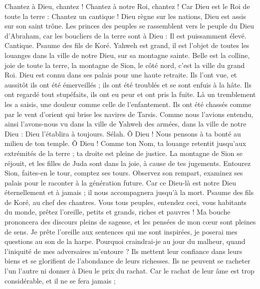 \begin{multicols}{2}
Chantez à Dieu, chantez ! Chantez à notre Roi, chantez !
Car Dieu est le Roi de toute la terre : Chantez un cantique !
Dieu règne sur les nations, Dieu est assis sur son saint trône.
Les princes des peuples se rassemblent vers le peuple du Dieu d'Abraham, car les boucliers de la terre sont à Dieu : Il est puissamment élevé.
\VerseOne{}Cantique. Psaume des fils de Koré.
Yahweh est grand, il est l'objet de toutes les louanges dans la ville de notre Dieu, sur sa montagne sainte.
Belle est la colline, joie de toute la terre, la montagne de Sion, le côté nord, c'est la ville du grand Roi.
Dieu est connu dans ses palais pour une haute retraite.
Ils l'ont vue, et aussitôt ils ont été émerveillés ; ils ont été troublés et se sont enfuis à la hâte.
Ils ont regardé tout stupéfaits, ils ont eu peur et ont pris la fuite.
Là un tremblement les a saisis, une douleur comme celle de l'enfantement.
Ils ont été chassés comme par le vent d'orient qui brise les navires de Tarsis.
Comme nous l'avions entendu, ainsi l'avons-nous vu dans la ville de Yahweh des armées, dans la ville de notre Dieu : Dieu l'établira à toujours. Sélah.
Ô Dieu ! Nous pensons à ta bonté au milieu de ton temple.
Ô Dieu ! Comme ton Nom, ta louange retentit jusqu'aux extrémités de la terre ; ta droite est pleine de justice.
La montagne de Sion se réjouit, et les filles de Juda sont dans la joie, à cause de tes jugements.
Entourez Sion, faites-en le tour, comptez ses tours.
Observez son rempart, examinez ses palais pour le raconter à la génération future.
Car ce Dieu-là est notre Dieu éternellement et à jamais ; il nous accompagnera jusqu'à la mort.
\VerseOne{}Psaume des fils de Koré, au chef des chantres.
Vous tous peuples, entendez ceci, vous habitants du monde, prêtez l'oreille,
petits et grands, riches et pauvres !
Ma bouche prononcera des discours pleins de sagesse, et les pensées de mon cœur sont pleines de sens.
Je prête l'oreille aux sentences qui me sont inspirées, je poserai mes questions au son de la harpe.
Pourquoi craindrai-je au jour du malheur, quand l'iniquité de mes adversaires m'entoure ?
Ils mettent leur confiance dans leurs biens et se glorifient de l'abondance de leurs richesses.
Ils ne peuvent se racheter l'un l'autre ni donner à Dieu le prix du rachat.
Car le rachat de leur âme est trop considérable, et il ne se fera jamais ;

\end{multicols}
